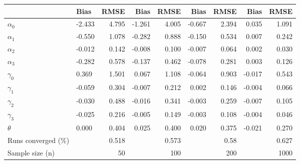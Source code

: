 
\begin{tabular}[t]{llrrrrrrr}
\toprule
  & Bias & RMSE & Bias & RMSE & Bias & RMSE & Bias & RMSE\\
\midrule
$\alpha_{0}$ & -2.433 & 4.795 & -1.261 & 4.005 & -0.667 & 2.394 & 0.035 & 1.091\\
$\alpha_{1}$ & -0.550 & 1.078 & -0.282 & 0.888 & -0.150 & 0.534 & 0.007 & 0.242\\
$\alpha_{2}$ & -0.012 & 0.142 & -0.008 & 0.100 & -0.007 & 0.064 & 0.002 & 0.030\\
$\alpha_{3}$ & -0.282 & 0.578 & -0.137 & 0.462 & -0.078 & 0.281 & 0.003 & 0.126\\
$\gamma_{0}$ & 0.369 & 1.501 & 0.067 & 1.108 & -0.064 & 0.903 & -0.017 & 0.543\\
$\gamma_{1}$ & -0.059 & 0.304 & -0.007 & 0.212 & 0.002 & 0.146 & -0.004 & 0.066\\
$\gamma_{2}$ & -0.030 & 0.488 & -0.016 & 0.341 & -0.003 & 0.259 & -0.007 & 0.105\\
$\gamma_{3}$ & -0.025 & 0.216 & -0.005 & 0.149 & -0.003 & 0.108 & -0.004 & 0.046\\
$\theta$ & 0.000 & 0.404 & 0.025 & 0.400 & 0.020 & 0.375 & -0.021 & 0.270\\
Runs converged (\%) &  & 0.518 &  & 0.573 &  & 0.58 &  & 0.627\\
Sample size (n) &  & 50 &  & 100 &  & 200 &  & 1000\\
\bottomrule
\end{tabular}
